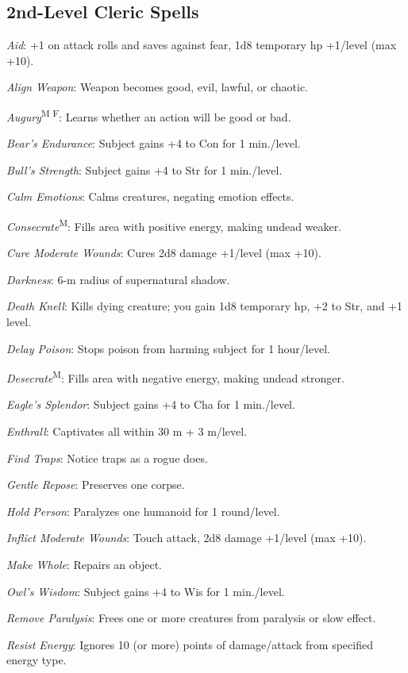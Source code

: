 \subsection{2nd-Level Cleric Spells}

\textit{Aid}: +1 on attack rolls and saves against fear, 1d8 temporary hp +1/level (max +10).

\textit{Align Weapon}: Weapon becomes good, evil, lawful, or chaotic.

\textit{Augury}\textsuperscript{M F}: Learns whether an action will be good or bad.

\textit{Bear's Endurance}: Subject gains +4 to Con for 1 min./level.

\textit{Bull's Strength}: Subject gains +4 to Str for 1 min./level.

\textit{Calm Emotions}: Calms creatures, negating emotion effects.

\textit{Consecrate}\textsuperscript{M}: Fills area with positive energy, making undead weaker.

\textit{Cure Moderate Wounds}: Cures 2d8 damage +1/level (max +10).

\textit{Darkness}: 6-m radius of supernatural shadow.

\textit{Death Knell}: Kills dying creature; you gain 1d8 temporary hp, +2 to Str, and +1 level.

\textit{Delay Poison}: Stops poison from harming subject for 1 hour/level.

\textit{Desecrate}\textsuperscript{M}: Fills area with negative energy, making undead stronger.

\textit{Eagle's Splendor}: Subject gains +4 to Cha for 1 min./level.

\textit{Enthrall}: Captivates all within 30 m + 3 m/level.

\textit{Find Traps}: Notice traps as a rogue does.

\textit{Gentle Repose}: Preserves one corpse.

\textit{Hold Person}: Paralyzes one humanoid for 1 round/level.

\textit{Inflict Moderate Wounds}: Touch attack, 2d8 damage +1/level (max +10).

\textit{Make Whole}: Repairs an object.

\textit{Owl's Wisdom}: Subject gains +4 to Wis for 1 min./level.

\textit{Remove Paralysis}: Frees one or more creatures from paralysis or slow effect.

\textit{Resist Energy}: Ignores 10 (or more) points of damage/attack from specified energy type.

